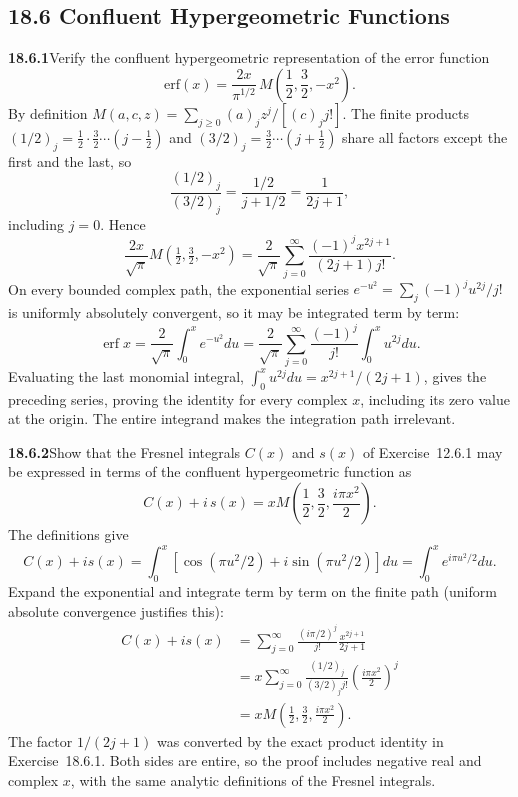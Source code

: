 \subsection*{18.6 Confluent Hypergeometric Functions}

\par\bigskip
\noindent\textbf{18.6.1}\quad Verify the confluent hypergeometric
representation of the error function
\[
\mathrm{erf}(x)=\frac{2x}{\pi^{1/2}}\,
M\left(\frac{1}{2},\frac{3}{2},-x^{2}\right).
\]
\solution
By definition $M(a,c,z)=\sum_{j\ge0}(a)_jz^j/[(c)_j j!]$.
The finite products $(1/2)_j=\frac12\cdot\frac32\cdots(j-\frac12)$
and $(3/2)_j=\frac32\cdots(j+\frac12)$ share all factors except the
first and the last, so
\[
\frac{(1/2)_j}{(3/2)_j}
 =\frac{1/2}{j+1/2}=\frac1{2j+1},
\]
including $j=0$.  Hence
\[
\frac{2x}{\sqrt\pi}M(\tfrac12,\tfrac32,-x^2)
 =\frac2{\sqrt\pi}\sum_{j=0}^\infty
   \frac{(-1)^jx^{2j+1}}{(2j+1)j!}.
\]
On every bounded complex path, the exponential series
$e^{-u^2}=\sum_j(-1)^ju^{2j}/j!$ is uniformly absolutely
convergent, so it may be integrated term by term:
\[
\operatorname{erf}x=\frac2{\sqrt\pi}\int_0^xe^{-u^2}du
 =\frac2{\sqrt\pi}\sum_{j=0}^\infty\frac{(-1)^j}{j!}
          \int_0^xu^{2j}du.
\]
Evaluating the last monomial integral,
$\int_0^xu^{2j}du=x^{2j+1}/(2j+1)$, gives the preceding series,
proving the identity for every complex $x$, including its zero value
at the origin.  The entire integrand makes the integration path
irrelevant.

\par\bigskip
\noindent\textbf{18.6.2}\quad Show that the Fresnel integrals $C(x)$
and $s(x)$ of Exercise~12.6.1 may be expressed in terms of the
confluent hypergeometric function as
\[
C(x)+i\,s(x)=xM\left(\frac{1}{2},\frac{3}{2},\frac{i\pi x^{2}}{2}\right).
\]
\solution
The definitions give
\[
C(x)+is(x)=\int_0^x[\cos(\pi u^2/2)+i\sin(\pi u^2/2)]du
         =\int_0^xe^{i\pi u^2/2}du.
\]
Expand the exponential and integrate term by term on the finite
path (uniform absolute convergence justifies this):
\begin{align*}
C(x)+is(x)
 &=\sum_{j=0}^\infty\frac{(i\pi/2)^j}{j!}
                  \frac{x^{2j+1}}{2j+1}\\
 &=x\sum_{j=0}^\infty
    \frac{(1/2)_j}{(3/2)_j j!}
                 \left(\frac{i\pi x^2}{2}\right)^j\\
 &=\boxed{xM\!\left(\tfrac12,\tfrac32,\frac{i\pi x^2}{2}\right)}.
\end{align*}
The factor $1/(2j+1)$ was converted by the exact product identity
in Exercise~18.6.1.  Both sides are entire, so the proof includes
negative real and complex $x$, with the same analytic definitions
of the Fresnel integrals.

